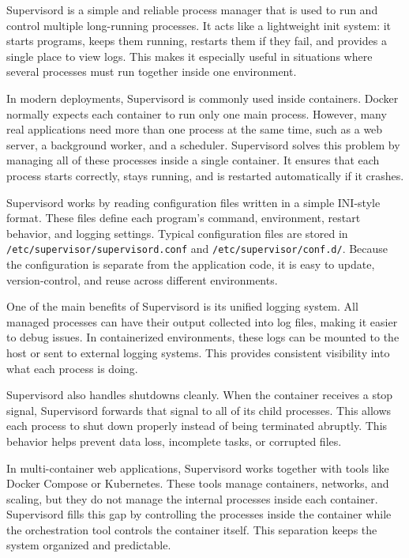 \documentclass[12pt,titlepage]{article}
\begin{document}
Supervisord is a simple and reliable process manager that is used to run and control multiple long-running processes. It acts like a lightweight init system: it starts programs, keeps them running, restarts them if they fail, and provides a single place to view logs. This makes it especially useful in situations where several processes must run together inside one environment.

In modern deployments, Supervisord is commonly used inside containers. Docker normally expects each container to run only one main process. However, many real applications need more than one process at the same time, such as a web server, a background worker, and a scheduler. Supervisord solves this problem by managing all of these processes inside a single container. It ensures that each process starts correctly, stays running, and is restarted automatically if it crashes.

Supervisord works by reading configuration files written in a simple INI-style format. These files define each program's command, environment, restart behavior, and logging settings. Typical configuration files are stored in \texttt{/etc/supervisor/supervisord.conf} and \texttt{/etc/supervisor/conf.d/}. Because the configuration is separate from the application code, it is easy to update, version-control, and reuse across different environments.

One of the main benefits of Supervisord is its unified logging system. All managed processes can have their output collected into log files, making it easier to debug issues. In containerized environments, these logs can be mounted to the host or sent to external logging systems. This provides consistent visibility into what each process is doing.

Supervisord also handles shutdowns cleanly. When the container receives a stop signal, Supervisord forwards that signal to all of its child processes. This allows each process to shut down properly instead of being terminated abruptly. This behavior helps prevent data loss, incomplete tasks, or corrupted files.

In multi-container web applications, Supervisord works together with tools like Docker Compose or Kubernetes. These tools manage containers, networks, and scaling, but they do not manage the internal processes inside each container. Supervisord fills this gap by controlling the processes inside the container while the orchestration tool controls the container itself. This separation keeps the system organized and predictable.
\end{document}
